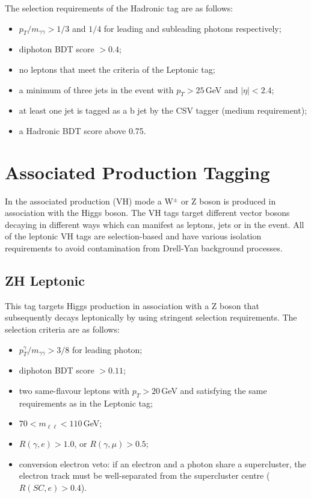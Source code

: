 The selection requirements of the \ttH Hadronic tag are as follows:
\begin{itemize}[noitemsep]
    \item $p_{T}/m_{\gamma\gamma} > 1/3$ and $1/4$ for leading and subleading photons respectively;
    \item diphoton BDT score $> 0.4$;
    \item no leptons that meet the criteria of the \ttH Leptonic tag;
    \item a minimum of three jets in the event with $p_{T} > 25$\,GeV and $|\eta| < 2.4$;
    \item at least one jet is tagged as a b jet by the CSV tagger (medium requirement);
    \item a \ttH Hadronic BDT score above 0.75.
\end{itemize}











\section[VH Tagging]{Associated Production Tagging}
In the associated production (VH) mode a W$^{\pm}$ or Z boson is produced in association with the Higgs boson. The VH tags target different vector bosons decaying in different ways which can manifest as leptons, jets or \MET in the event.
All of the leptonic VH tags are selection-based and have various isolation requirements to avoid contamination from Drell-Yan background processes.

\subsection{ZH Leptonic}
This tag targets Higgs production in association with a Z boson that subsequently decays leptonically by using stringent selection requirements. The selection criteria are as follows:
\begin{itemize}[noitemsep]
    \item $p^{\gamma}_{T}/m_{\gamma\gamma} > 3/8$ for leading photon;
    \item diphoton BDT score $> 0.11$;
    \item two same-flavour leptons with $p_T > 20$\,GeV and satisfying the same requirements as in the \ttH Leptonic tag;
    \item $70 < m_{\ell\ell} < 110$\,GeV;
    \item $R(\gamma,e) > 1.0$, or $R(\gamma,\mu) > 0.5$;
    \item conversion electron veto: if an electron and a photon share a supercluster, the electron track must be well-separated from the supercluster centre ($R(SC,e) > 0.4$).
\end{itemize}


